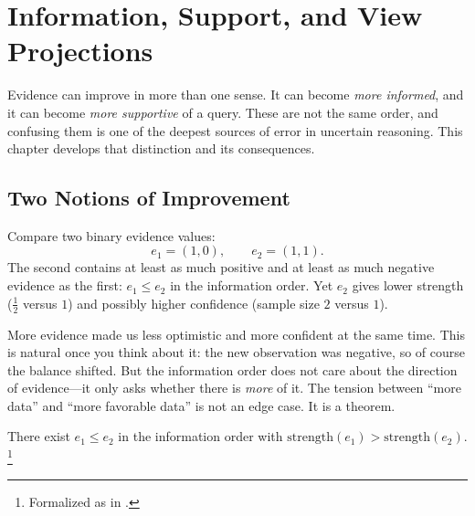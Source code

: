 \documentclass[11pt,openany]{report}
\begin{document}



\chapter{Information, Support, and View Projections}
\label{ch:views}

Evidence can improve in more than one sense.  It can become
\emph{more informed}, and it can become \emph{more supportive} of a
query.  These are not the same order, and confusing them is one of
the deepest sources of error in uncertain reasoning.  This chapter
develops that distinction and its consequences.

\section{Two Notions of Improvement}

Compare two binary evidence values:
\[
  e_1 = (1, 0), \qquad e_2 = (1, 1).
\]
The second contains at least as much positive and at least as much
negative evidence as the first: $e_1 \le e_2$ in the information
order.  Yet $e_2$ gives lower strength ($\tfrac{1}{2}$ versus $1$)
and possibly higher confidence (sample size $2$ versus $1$).

More evidence made us less optimistic and more confident at the same
time.  This is natural once you think about it: the new observation
was negative, so of course the balance shifted.  But the information
order does not care about the direction of evidence---it only asks
whether there is \emph{more} of it.  The tension between ``more
data'' and ``more favorable data'' is not an edge case.  It is a
theorem.

\begin{theorem}
\label{thm:strength-not-monotone}
There exist $e_1 \le e_2$ in the information order with
$\mathrm{strength}(e_1) > \mathrm{strength}(e_2)$.%
\footnote{Formalized as 
in .}
\end{theorem}
\end{document}
